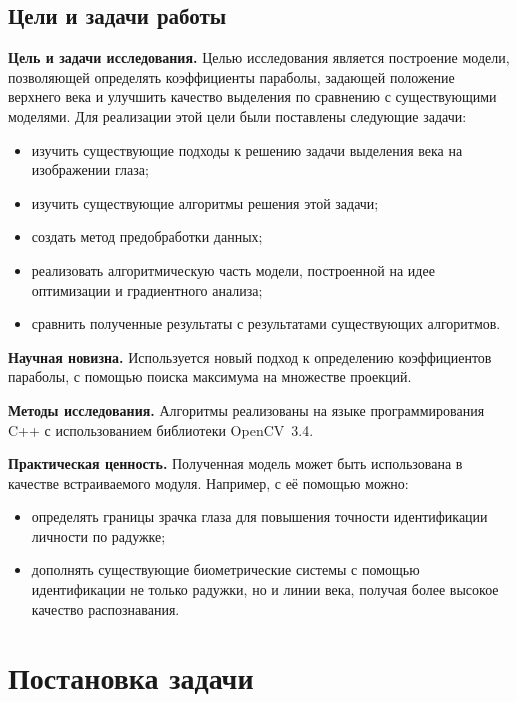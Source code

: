 \documentclass[12pt,a4paper]{article} %
\begin{document}
\newpage
\subsection{Цели и задачи работы}

\textbf{Цель и задачи исследования.} Целью исследования является построение модели, позволяющей определять коэффициенты параболы, задающей положение верхнего века и улучшить качество выделения по сравнению с существующими моделями. Для реализации этой цели были поставлены следующие задачи:
\begin{itemize}
	\item изучить существующие подходы к решению задачи выделения века на изображении глаза;
	\item изучить существующие алгоритмы решения этой задачи;
	\item создать метод предобработки данных;
	\item реализовать алгоритмическую часть модели, построенной на идее оптимизации и градиентного анализа;
	\item сравнить полученные результаты с результатами существующих алгоритмов.
\end{itemize}

\bigskip

\textbf{Научная новизна.} Используется новый подход к определению коэффициентов параболы, с помощью поиска максимума на множестве проекций.

\bigskip

\textbf{Методы исследования.} Алгоритмы реализованы на языке программирования C++ с использованием библиотеки OpenCV~3.4.

\bigskip

\textbf{Практическая ценность.} Полученная модель может быть использована в качестве встраиваемого модуля. Например, с её помощью можно:
\begin{itemize}
	\item определять границы зрачка глаза для повышения точности идентификации личности по радужке;
	\item дополнять существующие биометрические системы с помощью идентификации не только радужки, но и линии века, получая более высокое качество распознавания.
\end{itemize}


\newpage
\section{Постановка задачи}
\end{document}
